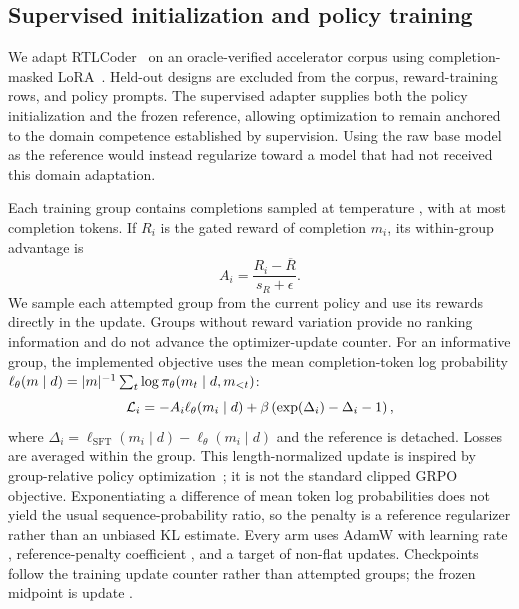 \subsection{Supervised initialization and policy training}

We adapt RTLCoder~\cite{liu2024rtlcoder} on an oracle-verified accelerator
corpus using completion-masked LoRA~\cite{hu2022lora}.  Held-out designs are
excluded from the corpus, reward-training rows, and policy prompts.  The
supervised adapter supplies both the policy initialization and the frozen
reference, allowing optimization to remain anchored to the domain competence
established by supervision. Using the raw base model as the reference would
instead regularize toward a model that had not received this domain adaptation.

Each training group contains  completions sampled
at temperature , with at most
 completion tokens.  If $R_i$ is the
gated reward of completion $m_i$, its within-group advantage is
\begin{equation}
A_i=\frac{R_i-\overline{R}}{s_R+\epsilon}.
\label{eq:advantage}
\end{equation}
We sample each attempted group from the current policy and use its rewards
directly in the update. Groups without reward variation provide no ranking
information and do not advance the optimizer-update counter. For an informative group, the
implemented objective uses the mean completion-token log probability
$\ell_\theta(m\mid d)=|m|^{-1}\sum_t
\log\pi_\theta(m_t\mid d,m_{<t})$:
\begin{equation}
\mathcal{L}_i=-A_i\ell_\theta(m_i\mid d)
+\beta\left(\exp(\Delta_i)-\Delta_i-1\right),
\label{eq:policy-loss}
\end{equation}
where $\Delta_i=\ell_{\mathrm{SFT}}(m_i\mid d)-
\ell_\theta(m_i\mid d)$ and the reference is detached.  Losses are averaged
within the group.  This length-normalized update is inspired by group-relative
policy optimization~\cite{shao2024deepseekmath}; it is not the standard clipped
GRPO objective.  Exponentiating a difference of mean token log probabilities
does not yield the usual sequence-probability ratio, so the penalty is a
reference regularizer rather than an unbiased KL estimate.
Every arm uses AdamW with learning rate
, reference-penalty coefficient
, and a target of
 non-flat updates. Checkpoints follow the
training update counter rather than attempted groups; the frozen midpoint is
update .

